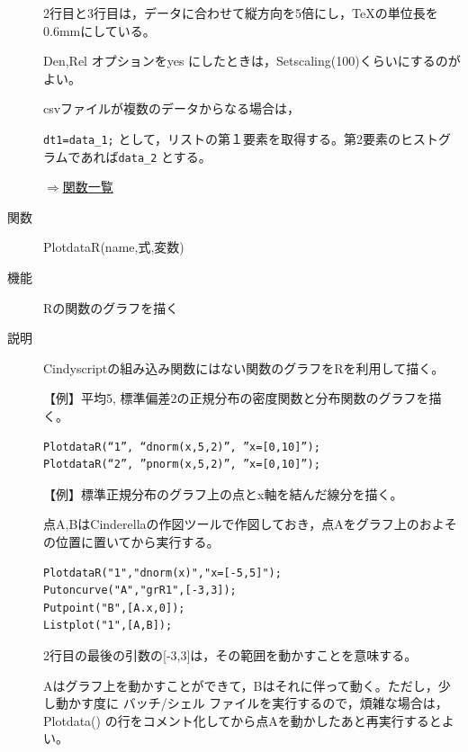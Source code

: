 \documentclass[papersize,a4paper,10pt,uplatex]{jsarticle}
\begin{document}
\begin{description}
2行目と3行目は，データに合わせて縦方向を5倍にし，TeXの単位長を0.6mmにしている。

Den,Rel オプションをyes にしたときは，Setscaling(100)くらいにするのがよい。

csvファイルが複数のデータからなる場合は，

\verb|dt1=data_1;|
として，リストの第１要素を取得する。第2要素のヒストグラムであれば\verb|data_2| とする。

\vspace{\baselineskip}
\begin{flushright}\hyperlink{functionlist}{$\Rightarrow$関数一覧}\end{flushright}

\hypertarget{plotdatar}{}
\item[関数]PlotdataR(name,式,変数)
\item[機能]Rの関数のグラフを描く
\item[説明]Cindyscriptの組み込み関数にはない関数のグラフをRを利用して描く。

\vspace{\baselineskip}
【例】平均5, 標準偏差2の正規分布の密度関数と分布関数のグラフを描く。
\begin{verbatim}
PlotdataR(“1”, “dnorm(x,5,2)”, ”x=[0,10]”);
PlotdataR(“2”, ”pnorm(x,5,2)”, ”x=[0,10]”);
\end{verbatim}

\hspace{20mm} 

【例】標準正規分布のグラフ上の点とx軸を結んだ線分を描く。

点A,BはCinderellaの作図ツールで作図しておき，点Aをグラフ上のおよその位置に置いてから実行する。
\begin{verbatim}
PlotdataR("1","dnorm(x)","x=[-5,5]");
Putoncurve("A","grR1",[-3,3]);
Putpoint("B",[A.x,0]);
Listplot("1",[A,B]);
\end{verbatim}
2行目の最後の引数の[-3,3]は，その範囲を動かすことを意味する。

Aはグラフ上を動かすことができて，Bはそれに伴って動く。ただし，少し動かす度に バッチ/シェル ファイルを実行するので，煩雑な場合は，Plotdata() の行をコメント化してから点Aを動かしたあと再実行するとよい。


\end{description}
\end{document}
